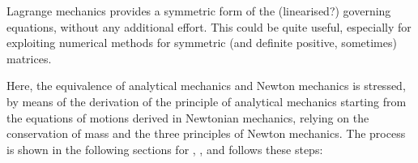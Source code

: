 \documentclass[letterpaper,10pt,english]{jupyterBook}
\begin{document}
\sphinxAtStartPar
{} Lagrange mechanics provides a symmetric form of the (linearised?) governing equations, without any additional effort. This could be quite useful, especially for exploiting numerical methods for symmetric (and definite positive, sometimes) matrices.

\sphinxAtStartPar
Here, the equivalence of analytical mechanics and Newton mechanics is stressed, by means of the derivation of the principle of analytical mechanics starting from the equations of motions derived in Newtonian mechanics, relying on the conservation of mass and the three principles of Newton mechanics. The process is shown in the following sections for {\hyperref[\detokenize{ch/lagrange-point:classical-mechanics-lagrange-point}]{}}, {\hyperref[\detokenize{ch/lagrange-points:classical-mechanics-lagrange-points}]{}}, {\hyperref[\detokenize{ch/lagrange-rigid-body:classical-mechanics-lagrange-rigid}]{}} and follows these steps:
\end{document}
